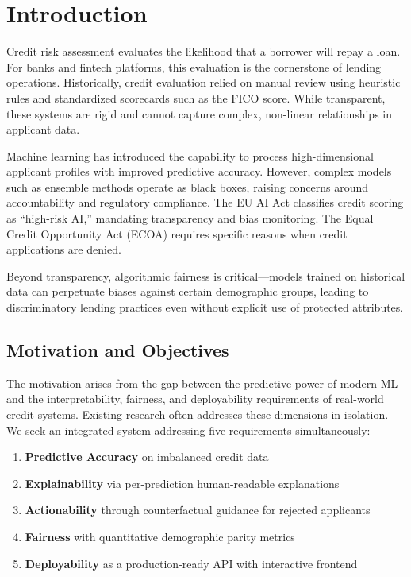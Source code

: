 \documentclass[journal]{IEEEtran}
\begin{document}
\section{Introduction}

Credit risk assessment evaluates the likelihood that a borrower will repay a loan. For banks and fintech platforms, this evaluation is the cornerstone of lending operations. Historically, credit evaluation relied on manual review using heuristic rules and standardized scorecards such as the FICO score. While transparent, these systems are rigid and cannot capture complex, non-linear relationships in applicant data.

Machine learning has introduced the capability to process high-dimensional applicant profiles with improved predictive accuracy. However, complex models such as ensemble methods operate as black boxes, raising concerns around accountability and regulatory compliance. The EU AI Act classifies credit scoring as ``high-risk AI,'' mandating transparency and bias monitoring. The Equal Credit Opportunity Act (ECOA) requires specific reasons when credit applications are denied.

Beyond transparency, algorithmic fairness is critical---models trained on historical data can perpetuate biases against certain demographic groups, leading to discriminatory lending practices even without explicit use of protected attributes.

\subsection{Motivation and Objectives}

The motivation arises from the gap between the predictive power of modern ML and the interpretability, fairness, and deployability requirements of real-world credit systems. Existing research often addresses these dimensions in isolation. We seek an integrated system addressing five requirements simultaneously:

\begin{enumerate}[nosep]
  \item \textbf{Predictive Accuracy} on imbalanced credit data
  \item \textbf{Explainability} via per-prediction human-readable explanations
  \item \textbf{Actionability} through counterfactual guidance for rejected applicants
  \item \textbf{Fairness} with quantitative demographic parity metrics
  \item \textbf{Deployability} as a production-ready API with interactive frontend
\end{enumerate}
\end{document}
